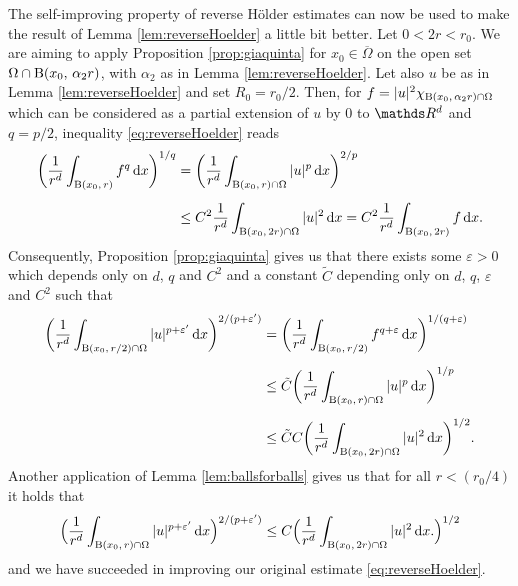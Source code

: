   \begin{rem}
    \label{rem:reverseHoelder}
    The self-improving property of reverse Hölder estimates can now be used to make the result of Lemma \ref{lem:reverseHoelder} a little bit better. 
    Let $0 < 2r < r_0$.
    We are aiming to apply Proposition \ref{prop:giaquinta} for $x_0 \in \overline\Omega$ on the open set $\Omega \cap \mathrm{B}(x_0,\, \alpha_2 r)$, with $\alpha_2$ as in Lemma \ref{lem:reverseHoelder}.
    Let also $u$ be as in Lemma \ref{lem:reverseHoelder} and set $R_0 = r_0/2$. 
    Then, for $f = |u|^{2} \chi_{\mathrm{B}(x_0,\,\alpha_2 r) \cap \Omega}$ which can be considered as a partial extension of $u$ by $0$ to $\R^d$ and $q = p/2$, inequality \eqref{eq:reverseHoelder} reads
    \begin{align*}
      \bigg( \frac{1}{r^d} \int_{\mathrm{B}(x_0,\, r)} f^q \, {\operatorname{d}\!{x}} \bigg)^{1/q}
      &= \bigg( \frac{1}{r^d} \int_{\mathrm{B}(x_0,\, r) \cap \Omega} |u|^p \, {\operatorname{d}\!{x}} \bigg)^{2/p} \\[0.5em]
      &\leq C^2 \frac{1}{r^d} \int_{\mathrm{B}(x_0,\, 2r) \cap \Omega} |u|^2 \, {\operatorname{d}\!{x}}
      = C^2 \frac{1}{r^d} \int_{\mathrm{B}(x_0,\, 2r)} f \, {\operatorname{d}\!{x}}.
    \end{align*}
    Consequently, Proposition \ref{prop:giaquinta} gives us that there exists some $\varepsilon > 0$ which depends only on $d$, $q$ and $C^2$ and a constant $\tilde C$ depending only on $d$, $q$, $\varepsilon$ and $C^2$ such that
    \begin{align*}
      \bigg( \frac{1}{r^d} \int_{\mathrm{B}(x_0,\, r/2) \cap \Omega} |u|^{p + \varepsilon'}\, {\operatorname{d}\!{x}} \bigg)^{2/(p + \varepsilon ')} 
      &= \bigg( \frac{1}{r^d} \int_{\mathrm{B}(x_0,\, r/2)} f^{q + \varepsilon} \, {\operatorname{d}\!{x}} \bigg)^{1/(q + \varepsilon)} \\[0.5em]
      &\leq \tilde C \bigg( \frac{1}{r^d} \int_{\mathrm{B}(x_0,\, r) \cap \Omega} |u|^p \, {\operatorname{d}\!{x}} \bigg)^{1/p} \\[0.5em]
      &\leq \tilde C C \bigg( \frac{1}{r^d} \int_{\mathrm{B}(x_0,\,2r)\cap \Omega } |u|^2 \, {\operatorname{d}\!{x}} \bigg)^{1/2}.
    \end{align*}
    Another application of Lemma \ref{lem:ballsforballs} gives us that for all $r < ( r_0/4 )$ it holds that
    \begin{align}
      \label{eq:improvedreverseHoelder}
      \Big( \frac{1}{r^d} \int_{\mathrm{B}(x_0,\, r) \cap \Omega} |u|^{p + \varepsilon'} \, {\operatorname{d}\!{x}} \Big)^{2/(p + \varepsilon')}
      \leq C \Big(\frac{1}{r^d} \int_{\mathrm{B}(x_0,\, 2r) \cap \Omega} |u|^2 \, {\operatorname{d}\!{x}}.  \Big)^{1/2}
    \end{align}
    and we have succeeded in improving our original estimate \eqref{eq:reverseHoelder}.
  \end{rem}

